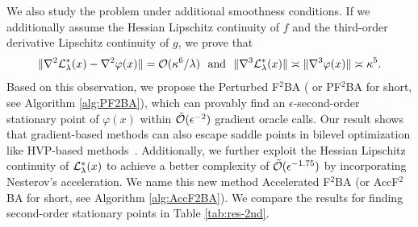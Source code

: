 \documentclass[twoside,11pt]{article}
\begin{document}
\begin{table}[t]
\begin{tablenotes}
    \end{tablenotes}
\end{table}



We also study the problem under additional smoothness conditions.
If we additionally assume the Hessian Lipschitz continuity of $f$ and the third-order derivative Lipschitz continuity of $g$, we prove that
\begin{align*}
    \Vert \nabla^2 {\mathcal{L}}_{\lambda}^*(x) - \nabla^2 \varphi(x) \Vert = {\mathcal{O}}(\kappa^6 /\lambda) ~~{\rm and}~~  \Vert \nabla^3 {\mathcal{L}}_{\lambda}^*(x) \Vert \asymp \Vert \nabla^3 \varphi(x) \Vert \asymp \kappa^5.
\end{align*} 
Based on this observation, we propose the Perturbed F${}^2$BA ( or PF${}^2$BA for short, see Algorithm \ref{alg:PF2BA}), which can provably find an $\epsilon$-second-order stationary point of $\varphi(x)$ within $\tilde {{\mathcal{O}}}(\epsilon^{-2})$ gradient oracle calls.
Our result shows that gradient-based methods can also escape saddle points in bilevel optimization like HVP-based methods~\citep{huang2022efficiently}. {Additionally, we further exploit the Hessian Lipschitz continuity of ${\mathcal{L}}_{\lambda}^*(x)$ to achieve a better complexity of $\tilde {{\mathcal{O}}}(\epsilon^{-1.75})$ by incorporating Nesterov's acceleration. We name this new method Accelerated F${}^2$BA (or AccF${}^2$BA for short, see Algorithm \ref{alg:AccF2BA}). We compare the results for finding second-order stationary points in Table \ref{tab:res-2nd}.}
\end{document}
